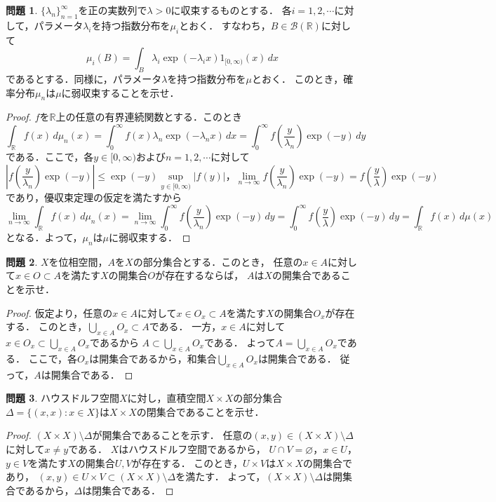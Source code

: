 \documentclass{jsarticle}
\theoremstyle{definition}
\newtheorem{qst}{問題}
\begin{document}
\begin{qst}
$\{\lambda_n\}_{n=1}^\infty$を正の実数列で$\lambda>0$に収束するものとする．
各$i=1,2,\cdots$に対して，パラメータ$\lambda_i$を持つ指数分布を$\mu_i$とおく．
すなわち，$B\in\mathcal{B}(\mathbb{R})$に対して
\[ \mu_i(B)=\int_B\lambda_i\exp(-\lambda_ix)1_{[0,\infty)}(x)\,dx \]
であるとする．同様に，パラメータ$\lambda$を持つ指数分布を$\mu$とおく．
このとき，確率分布$\mu_n$は$\mu$に弱収束することを示せ．
\end{qst}
\begin{proof}
$f$を$\mathbb{R}$上の任意の有界連続関数とする．このとき
\[
\int_\mathbb{R}f(x)\,d\mu_n(x)
=\int_0^\infty f(x)\lambda_n\exp(-\lambda_nx)\,dx
=\int_0^\infty f\left(\frac{y}{\lambda_n}\right)\exp(-y)\,dy
\]
である．ここで，各$y\in[0,\infty)$および$n=1,2,\cdots$に対して
\[
\left|f\left(\frac{y}{\lambda_n}\right)\exp(-y)\right|\leq\exp(-y)\sup_{y\in[0,\infty)}|f(y)|，
\lim_{n\to\infty}f\left(\frac{y}{\lambda_n}\right)\exp(-y)
=f\left(\frac{y}{\lambda}\right)\exp(-y)
\]
であり，優収束定理の仮定を満たすから
\[
\lim_{n\to\infty}\int_\mathbb{R}f(x)\,d\mu_n(x)
=\lim_{n\to\infty}\int_0^\infty f\left(\frac{y}{\lambda_n}\right)\exp(-y)\,dy
=\int_0^\infty f\left(\frac{y}{\lambda}\right)\exp(-y)\,dy
=\int_\mathbb{R}f(x)\,d\mu(x)
\]
となる．よって，$\mu_n$は$\mu$に弱収束する．
\end{proof}

\begin{qst}
$X$を位相空間，$A$を$X$の部分集合とする．このとき，
任意の$x\in A$に対して$x\in O\subset A$を満たす$X$の開集合$O$が存在するならば，
$A$は$X$の開集合であることを示せ．
\end{qst}
\begin{proof}
仮定より，任意の$x\in A$に対して$x\in O_x\subset A$を満たす$X$の開集合$O_x$が存在する．
このとき，$\bigcup_{x\in A}O_x\subset A$である．
一方，$x\in A$に対して$x\in O_x\subset\bigcup_{x\in A}O_x$であるから
$A\subset\bigcup_{x\in A}O_x$である．
よって$A=\bigcup_{x\in A}O_x$である．
ここで，各$O_x$は開集合であるから，和集合$\bigcup_{x\in A}O_x$は開集合である．
従って，$A$は開集合である．
\end{proof}

\begin{qst}
ハウスドルフ空間$X$に対し，直積空間$X\times X$の部分集合
$\Delta=\{(x,x):x\in X\}$は$X\times X$の閉集合であることを示せ．
\end{qst}
\begin{proof}
$(X\times X)\setminus\Delta$が開集合であることを示す．
任意の$(x,y)\in(X\times X)\setminus\Delta$に対して$x\neq y$である．
$X$はハウスドルフ空間であるから，
$U\cap V=\varnothing$，$x\in U$，$y\in V$を満たす$X$の開集合$U,V$が存在する．
このとき，$U\times V$は$X\times X$の開集合であり，
$(x,y)\in U\times V\subset(X\times X)\setminus\Delta$を満たす．
よって，$(X\times X)\setminus\Delta$は開集合であるから，$\Delta$は閉集合である．
\end{proof}
\end{document}
